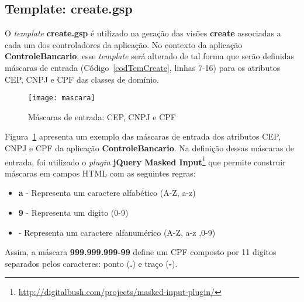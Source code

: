 \subsection{Template: create.gsp}

\vspace{0.5cm}

O  {\it  template} {\bf  create.gsp}  é utilizado  na  geração  das visões  {\bf
  create} associadas  a cada um dos  controladores da aplicação.  No contexto da
aplicação {\bf ControleBancario}, esse {\it template} será alterado de tal forma
que serão definidas máscaras de entrada (Código~\ref{codTemCreate}, linhas 7-16)
para os atributos CEP, CNPJ e CPF das classes de domínio. 

\begin{figure}[htbp]
\centering\texttt{[image: mascara]}
\caption{Máscaras de entrada: CEP, CNPJ e CPF}
\label{figMascara}
\end{figure}

Figura~\ref{figMascara}  apresenta  um  exemplo  das  máscaras  de  entrada  dos
atributos  CEP, CNPJ  e CPF  da aplicação  {\bf ControleBancario}.  Na definição
dessas  máscaras de entrada,  foi utilizado  o {\it  plugin} {\bf  jQuery Masked
  Input}\footnote{\url{http://digitalbush.com/projects/masked-input-plugin/}}
que permite construir máscaras em campos HTML com as seguintes regras: 

\begin{itemize}

\vspace{0.3cm}

\item {\bf a} - Representa um caractere alfabético (A-Z, a-z)

\vspace{0.3cm}

\item {\bf 9} - Representa um digito (0-9)

\vspace{0.3cm}

\item {\bf *} - Representa um caractere alfanumérico (A-Z, a-z ,0-9)

\end{itemize}

\vspace{0.3cm}

Assim,  a máscara {\bf  999.999.999-99} define  um CPF  composto por  11 digitos
separados pelos caracteres: ponto ({\bf .}) e traço ({\bf -}).  

